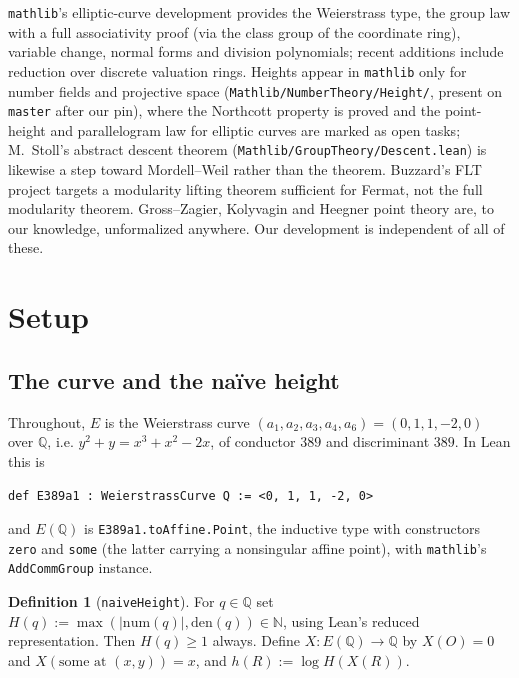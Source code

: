 \documentclass[11pt,reqno]{amsart}
\theoremstyle{plain}
\theoremstyle{definition}
\newtheorem{definition}[theorem]{Definition}
\theoremstyle{remark}
\DeclareRobustCommand{\lt}[1]{\texttt{#1}}
\newcommand{\nh}{H}
\begin{document}
\texttt{mathlib}'s elliptic-curve development \cite{mathlib} provides the
Weierstrass type, the group law with a full associativity proof (via the
class group of the coordinate ring), variable change, normal forms and
division polynomials; recent additions include reduction over discrete
valuation rings. Heights appear in \texttt{mathlib} only for number fields
and projective space (\texttt{Mathlib/NumberTheory/Height/}, present on
\texttt{master} after our pin), where the Northcott property is proved and
the point-height and parallelogram law for elliptic curves are marked as
open tasks; M.~Stoll's abstract descent theorem
(\texttt{Mathlib/GroupTheory/Descent.lean}) is likewise a step toward
Mordell--Weil rather than the theorem. Buzzard's FLT project \cite{FLT}
targets a modularity lifting theorem sufficient for Fermat, not the full
modularity theorem. Gross--Zagier, Kolyvagin and Heegner point theory are, to
our knowledge, unformalized anywhere. Our development is independent of all
of these.

\section{Setup}

\subsection{The curve and the na\"ive height}

Throughout, $E$ is the Weierstrass curve
$(a_1,a_2,a_3,a_4,a_6) = (0,1,1,-2,0)$ over $\mathbb{Q}$, i.e.
$y^2 + y = x^3 + x^2 - 2x$, of conductor $389$ and discriminant $389$. In
Lean this is
\begin{center}
\lt{def E389a1 : WeierstrassCurve Q := <0, 1, 1, -2, 0>}
\end{center}
and $E(\mathbb{Q})$ is \lt{E389a1.toAffine.Point}, the inductive type with
constructors \lt{zero} and \lt{some} (the latter carrying a nonsingular
affine point), with \texttt{mathlib}'s \lt{AddCommGroup} instance.

\begin{definition}[\lt{naiveHeight}]
For $q \in \mathbb{Q}$ set $\nh(q) := \max(\lvert \mathrm{num}(q)\rvert,
\mathrm{den}(q)) \in \mathbb{N}$, using Lean's reduced representation. Then
$\nh(q) \ge 1$ always. Define $X \colon E(\mathbb{Q}) \to \mathbb{Q}$ by
$X(O) = 0$ and $X(\text{some at } (x,y)) = x$, and
$h(R) := \log \nh(X(R))$.
\end{definition}
\end{document}
